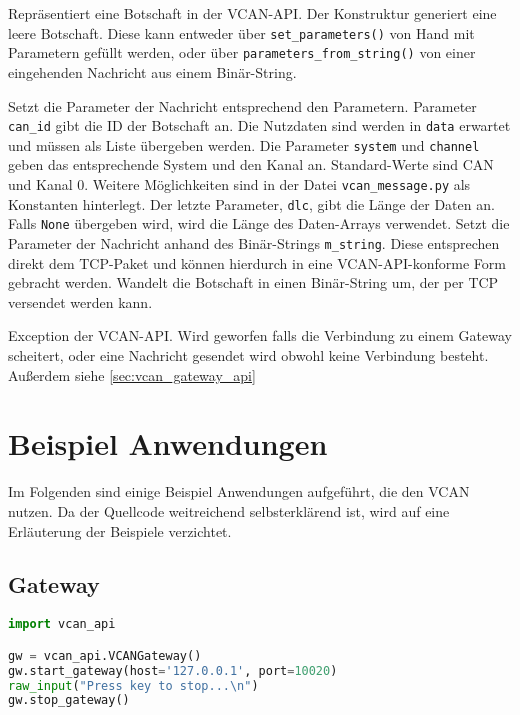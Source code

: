 \begin{description}
    Repräsentiert eine Botschaft in der VCAN-API. Der Konstruktur generiert eine leere Botschaft. Diese kann entweder über \texttt{set\_parameters()} von Hand mit Parametern gefüllt werden, oder über \texttt{parameters\_from\_string()} von einer eingehenden Nachricht aus einem Binär-String.
    \begin{description}
        Setzt die Parameter der Nachricht entsprechend den Parametern. Parameter \texttt{can\_id} gibt die ID der Botschaft an. Die Nutzdaten sind werden in \texttt{data} erwartet und müssen als Liste übergeben werden. Die Parameter \texttt{system} und \texttt{channel} geben das entsprechende System und den Kanal an. Standard-Werte sind CAN und Kanal 0. Weitere Möglichkeiten sind in der Datei \texttt{vcan\_message.py} als Konstanten hinterlegt. Der letzte Parameter, \texttt{dlc}, gibt die Länge der Daten an. Falls \texttt{None} übergeben wird, wird die Länge des Daten-Arrays verwendet.
        Setzt die Parameter der Nachricht anhand des Binär-Strings \texttt{m\_string}. Diese entsprechen direkt dem TCP-Paket und können hierdurch in eine VCAN-API-konforme Form gebracht werden.
        Wandelt die Botschaft in einen Binär-String um, der per TCP versendet werden kann.
    \end{description}
\end{description}

\begin{description}
    Exception der VCAN-API. Wird geworfen falls die Verbindung zu einem Gateway scheitert, oder eine Nachricht gesendet wird obwohl keine Verbindung besteht. Außerdem siehe \ref{sec:vcan_gateway_api}
\end{description}




\section{Beispiel Anwendungen}
\label{sec:vcan_beispiele}
Im Folgenden sind einige Beispiel Anwendungen aufgeführt, die den VCAN nutzen. Da der Quellcode weitreichend selbsterklärend ist, wird auf eine Erläuterung der Beispiele verzichtet.

\subsection{Gateway}
\label{sec:vcan_gateway_beispiele}
\begin{lstlisting}[frame=single, language=Python, basicstyle=\footnotesize, caption={Einfaches Gateway}, label={lst:bsp_gateway1}]
import vcan_api

gw = vcan_api.VCANGateway()
gw.start_gateway(host='127.0.0.1', port=10020)
raw_input("Press key to stop...\n")
gw.stop_gateway()
\end{lstlisting}


